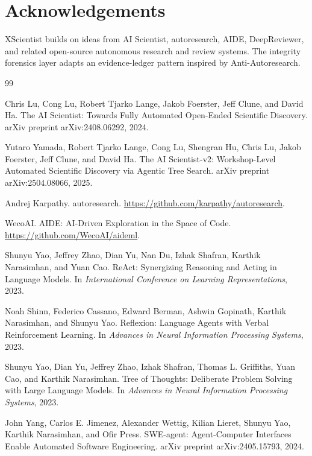 \documentclass[11pt]{article}
\begin{document}
\section*{Acknowledgements}

XScientist builds on ideas from AI Scientist, autoresearch, AIDE,
DeepReviewer, and related open-source autonomous research and review systems.
The integrity forensics layer adapts an evidence-ledger pattern inspired by
Anti-Autoresearch.

\begin{thebibliography}{99}

Chris Lu, Cong Lu, Robert Tjarko Lange, Jakob Foerster, Jeff Clune, and David Ha.
\newblock The AI Scientist: Towards Fully Automated Open-Ended Scientific Discovery.
\newblock arXiv preprint arXiv:2408.06292, 2024.

Yutaro Yamada, Robert Tjarko Lange, Cong Lu, Shengran Hu, Chris Lu, Jakob Foerster, Jeff Clune, and David Ha.
\newblock The AI Scientist-v2: Workshop-Level Automated Scientific Discovery via Agentic Tree Search.
\newblock arXiv preprint arXiv:2504.08066, 2025.

Andrej Karpathy.
\newblock autoresearch.
\newblock \url{https://github.com/karpathy/autoresearch}.

WecoAI.
\newblock AIDE: AI-Driven Exploration in the Space of Code.
\newblock \url{https://github.com/WecoAI/aideml}.

Shunyu Yao, Jeffrey Zhao, Dian Yu, Nan Du, Izhak Shafran, Karthik Narasimhan, and Yuan Cao.
\newblock ReAct: Synergizing Reasoning and Acting in Language Models.
\newblock In \emph{International Conference on Learning Representations}, 2023.

Noah Shinn, Federico Cassano, Edward Berman, Ashwin Gopinath, Karthik Narasimhan, and Shunyu Yao.
\newblock Reflexion: Language Agents with Verbal Reinforcement Learning.
\newblock In \emph{Advances in Neural Information Processing Systems}, 2023.

Shunyu Yao, Dian Yu, Jeffrey Zhao, Izhak Shafran, Thomas L. Griffiths, Yuan Cao, and Karthik Narasimhan.
\newblock Tree of Thoughts: Deliberate Problem Solving with Large Language Models.
\newblock In \emph{Advances in Neural Information Processing Systems}, 2023.

John Yang, Carlos E. Jimenez, Alexander Wettig, Kilian Lieret, Shunyu Yao, Karthik Narasimhan, and Ofir Press.
\newblock SWE-agent: Agent-Computer Interfaces Enable Automated Software Engineering.
\newblock arXiv preprint arXiv:2405.15793, 2024.


\end{thebibliography}
\end{document}
